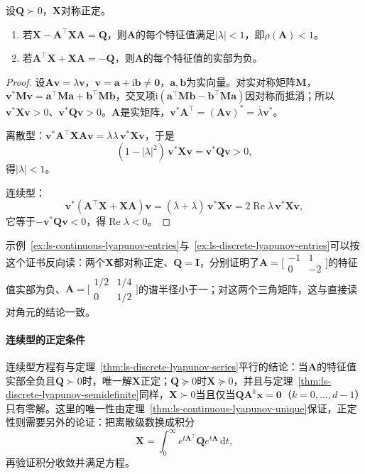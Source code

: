\begin{theorem}[正定解给出的谱证书]
\label{thm:ls-lyapunov-spectral-certificate}
设$\bm Q\succ0$，$\bm X$对称正定。
\begin{enumerate}
 \item 若$\bm X-\bm A^\top\bm X\bm A=\bm Q$，则$\bm A$的每个特征值满足$|\lambda|<1$，即$\rho(\bm A)<1$。
 \item 若$\bm A^\top\bm X+\bm X\bm A=-\bm Q$，则$\bm A$的每个特征值的实部为负。
\end{enumerate}
\end{theorem}

\begin{proof}
设$\bm A\bm v=\lambda\bm v$，$\bm v=\bm a+\mathrm i\bm b\neq\bm0$，$\bm a,\bm b$为实向量。对实对称矩阵$\bm M$，$\bm v^*\bm M\bm v=\bm a^\top\bm M\bm a+\bm b^\top\bm M\bm b$，交叉项$\mathrm i(\bm a^\top\bm M\bm b-\bm b^\top\bm M\bm a)$因对称而抵消；所以$\bm v^*\bm X\bm v>0$、$\bm v^*\bm Q\bm v>0$。$\bm A$是实矩阵，$\bm v^*\bm A^\top=(\bm A\bm v)^*=\bar\lambda\bm v^*$。

离散型：$\bm v^*\bm A^\top\bm X\bm A\bm v=\bar\lambda\lambda\,\bm v^*\bm X\bm v$，于是
\[
 (1-|\lambda|^2)\,\bm v^*\bm X\bm v=\bm v^*\bm Q\bm v>0 ,
\]
得$|\lambda|<1$。

连续型：
\[
 \bm v^*(\bm A^\top\bm X+\bm X\bm A)\bm v=(\bar\lambda+\lambda)\,\bm v^*\bm X\bm v=2\operatorname{Re}\lambda\,\bm v^*\bm X\bm v ,
\]
它等于$-\bm v^*\bm Q\bm v<0$，得$\operatorname{Re}\lambda<0$。
\end{proof}

示例~\ref{ex:ls-continuous-lyapunov-entries}与~\ref{ex:ls-discrete-lyapunov-entries}可以按这个证书反向读：两个$\bm X$都对称正定、$\bm Q=\bm I$，分别证明了$\bm A=\bigl[\begin{smallmatrix}-1&1\\0&-2\end{smallmatrix}\bigr]$的特征值实部为负、$\bm A=\bigl[\begin{smallmatrix}1/2&1/4\\0&1/2\end{smallmatrix}\bigr]$的谱半径小于一；对这两个三角矩阵，这与直接读对角元的结论一致。

\paragraph{连续型的正定条件}
连续型方程有与定理~\ref{thm:ls-discrete-lyapunov-series}平行的结论：当$\bm A$的特征值实部全负且$\bm Q\succ0$时，唯一解$\bm X$正定；$\bm Q\succeq0$时$\bm X\succeq0$，并且与定理~\ref{thm:ls-discrete-lyapunov-semidefinite}同样，$\bm X\succ0$当且仅当$\bm Q\bm A^k\bm x=\bm0$（$k=0,\ldots,d-1$）只有零解。这里的唯一性由定理~\ref{thm:ls-continuous-lyapunov-unique}保证，正定性则需要另外的论证：把离散级数换成积分
\[
 \bm X=\int_0^\infty e^{t\bm A^\top}\bm Qe^{t\bm A}\,\mathrm dt ,
\]
再验证积分收敛并满足方程。


